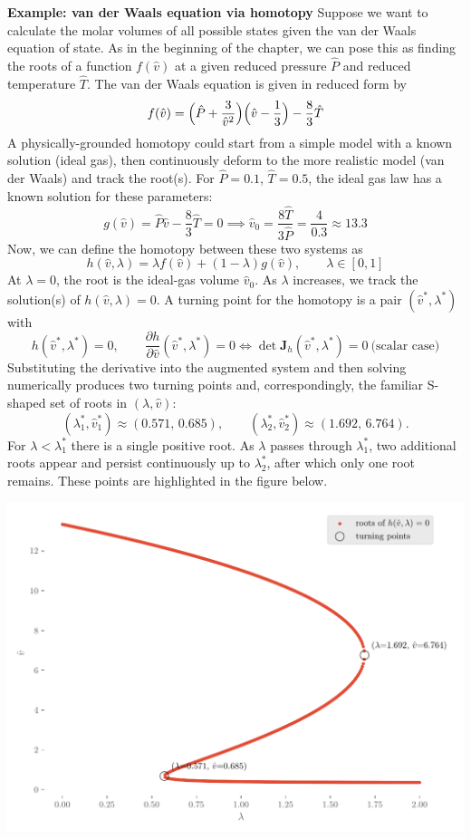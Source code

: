 \begin{exampleBox}
    \textbf{Example: van der Waals equation via homotopy}
    Suppose we want to calculate the molar volumes of all possible states given the van der Waals equation of state. As in the beginning of the chapter, we can pose this as finding the roots of a function $f(\hat v)$ at a given reduced pressure $\hat{P}$ and reduced temperature $\hat{T}$. The van der Waals equation is given in reduced form by
    \[
    f(\hat v)=\Bigl(\hat P+\frac{3}{\hat v^2}\Bigr)\Bigl(\hat v-\frac{1}{3}\Bigr)-\frac{8}{3}\hat T
    \]
    A physically-grounded homotopy could start from a simple model with a known solution (ideal gas), then continuously deform to the more realistic model (van der Waals) and track the root(s). For \(\hat P=0.1\), \(\hat T=0.5\), the ideal gas law has a known solution for these parameters:
    \[
    g(\hat v)=\hat P \hat v-\frac{8}{3}\hat T = 0
    \implies
    \hat v_0=\frac{8\hat T}{3\hat P}=\frac{4}{0.3} \approx 13.3
    \]
    Now, we can define the homotopy between these two systems as
    \[
    h(\hat v,\lambda)=\lambda f(\hat v)+(1-\lambda)g(\hat v),\qquad \lambda\in[0,1]
    \]
    At \(\lambda=0\), the root is the ideal-gas volume \(\hat v_0\). As \(\lambda\) increases, we track the solution(s) of \(h(\hat v,\lambda)=0\). A turning point for the homotopy is a pair $(\hat v^*,\lambda^*)$ with
    \[
    h(\hat v^*,\lambda^*)=0,
    \qquad
    \frac{\partial h}{\partial \hat v}(\hat v^*,\lambda^*)=0
    \iff
    \det \mathbf{J}_h(\hat v^*,\lambda^*)=0\ \text{(scalar case)}
    \]
    Substituting the derivative into the augmented system and then solving numerically produces two turning points and, correspondingly, the familiar S-shaped set of roots in $(\lambda,\hat v)$:
    \[
    (\lambda^*_1,\hat v^*_1)\approx(0.571,\,0.685),
    \qquad
    (\lambda^*_2,\hat v^*_2)\approx(1.692,\,6.764).
    \]
    For $\lambda<\lambda_1^*$ there is a single positive root. As $\lambda$ passes through $\lambda_1^*$, two additional roots appear and persist continuously up to $\lambda_2^*$, after which only one root remains. These points are highlighted in the figure below.
    \begin{center}
    \includegraphics[width=0.80\linewidth]{figs/nle/vdw_homotopy_branches.pdf}

\end{center}
\end{exampleBox}
